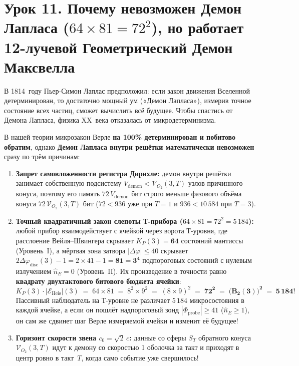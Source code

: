 \section{Урок 11. Почему невозможен Демон Лапласа (\texorpdfstring{$64 \times 81 = 72^2$}{64 x 81 = 72\^2}), но работает 12-лучевой Геометрический Демон Максвелла}

В 1814~году Пьер-Симон Лаплас предположил: если закон движения Вселенной детерминирован, то достаточно мощный ум («Демон Лапласа»), измерив точное состояние всех частиц, сможет вычислить всё будущее. Чтобы спастись от Демона Лапласа, физика XX~века отказалась от микродетерминизма.

В нашей теории микрозакон Верле \textbf{на 100\% детерминирован и побитово обратим}, однако \textbf{Демон Лапласа внутри решётки математически невозможен} сразу по трём причинам:
\begin{enumerate}[label=\textbf{\arabic*.},noitemsep]
\item \textbf{Запрет самовложенности регистра Дирихле:} демон внутри решётки занимает собственную подсистему $V_{\mathrm{demon}} < \mathcal{V}_{O_2}(3,T)$ узлов причинного конуса, поэтому его память $72\,V_{\mathrm{demon}}$ бит строго меньше фазового объёма конуса $72\,\mathcal{V}_{O_2}(3,T)$ бит ($72 < 936$ уже при $T=1$ и $936 < 10\,584$ при $T=3$).
\item \textbf{Точный квадратичный закон слепоты Т-прибора ($64\times 81 = 72^2 = 5\,184$):}
  любой прибор взаимодействует с ячейкой через ворота Т-уровня, где расслоение Вейля--Швингера скрывает $K_P(3) = \mathbf{64}$ состояний мантиссы (Уровень~I), а мёртвая зона затвора $|\Delta\varphi|\le 40$ скрывает $2\Delta\varphi_{\mathrm{disc}}(3) - 1 = 2\times 41 - 1 = \mathbf{81 = 3^4}$ подпороговых состояний с нулевым излучением $\hat{n}_E = 0$ (Уровень~II). Их произведение в точности равно \textbf{квадрату двухтактового битового бюджета ячейки}:
  \begin{equation}
    \label{eq:course-laplace-5184}
    K_P(3)\cdot |\mathcal{E}_{\mathrm{Heis}}|(3)
    \;=\; 64 \times 81
    \;=\; 8^2 \times 9^2
    \;=\; (8\times 9)^2
    \;=\; \mathbf{72^2 \;=\; \bigl(B_2(3)\bigr)^2 \;=\; 5\,184}!
  \end{equation}
  Пассивный наблюдатель на Т-уровне не различает $5\,184$ микросостояния в каждой ячейке, а если он пошлёт надпороговый зонд $|\Phi_{\mathrm{probe}}|\ge 41$ ($\hat{n}_E\ge 1$), он сам же сдвинет шаг Верле измеряемой ячейки и изменит её будущее!
\item \textbf{Горизонт скорости звена $c_0 = \sqrt{2}\,c$:} данные со сферы $S_T$ обратного конуса $\mathcal{V}_{O_2}(3,T)$ идут к демону со скоростью 1 оболочка за такт и приходят в центр ровно в такт~$T$, когда само событие уже свершилось!
\end{enumerate}

